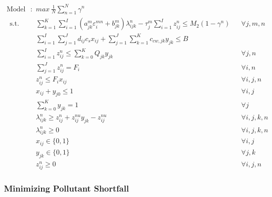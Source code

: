 \documentclass[preprint,12pt,authoryear]{elsarticle}
\renewcommand{\theequation}{\thesection--\arabic{equation}}
\begin{document}
\begin{align}\label{modelS1}
	\text{Model S1}:~~&max ~ \frac{1}{N}\sum_{n=1}^N \gamma^n \nonumber \\~~
	\mbox{s.t.}~~
	&\sum_{k=1}^K \sum_{i=1}^I (a_{jk}^m \varepsilon_i^{mn} + b_{jk}^m) \lambda_{ijk}^n - \tau_j^m \sum_{i=1}^I z_{ij}^n \leq M_2 (1-\gamma^n) && \forall j,m,n\\	
	&\sum_{i=1}^{I}\sum_{j=1}^{J}d_{ij}c_s x_{ij} + \sum_{j=1}^{J}\sum_{k=1}^{K}c_{cw,jk}y_{jk} \leq B && \\
 	&\sum_{i=1}^{I} z_{ij}^n \leq \sum_{k=0}^K Q_{jk} y_{jk} && \forall j,n\\
	&\sum_{j=1}^J z_{ij}^n = F_i && \forall i,n\\
	&z_{ij}^n \leq F_i x_{ij} && \forall i,j,n\\
	&x_{ij} + y_{j0} \leq 1 && \forall i,j\\
	&\sum_{k=0}^{K}y_{jk} = 1&&\forall j\\
	&\lambda_{ijk}^n \geq z_{ij}^n + z_{ij}^{nu} y_{jk} - z_{ij}^{nu} && \forall i,j,k,n\\
	&\lambda_{ijk}^n \geq 0 && \forall i,j,k,n\\
	&x_{ij} \in \{0,1\}&&\forall i,j\\
	&y_{jk} \in \{0,1\}&&\forall j,k\\
	&z_{ij}^n \geq 0&&\forall i,j,n
\end{align}
\renewcommand{\theequation}{\thesection--\arabic{equation}}

\newpage
\subsubsection{Minimizing Pollutant Shortfall}\label{minshoftfall}
\end{document}
